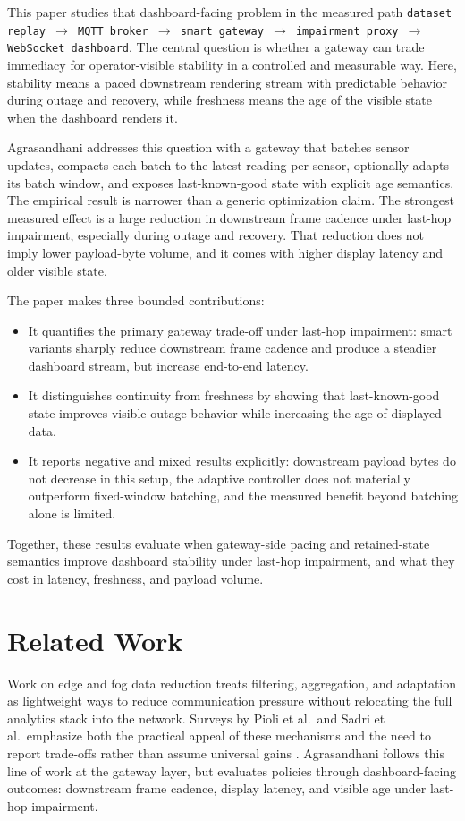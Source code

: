 \documentclass[sigconf,authorversion,nonacm]{acmart}
\begin{document}
This paper studies that dashboard-facing problem in the measured path \texttt{dataset replay $\rightarrow$ MQTT broker $\rightarrow$ smart gateway $\rightarrow$ impairment proxy $\rightarrow$ WebSocket dashboard}. The central question is whether a gateway can trade immediacy for operator-visible stability in a controlled and measurable way. Here, stability means a paced downstream rendering stream with predictable behavior during outage and recovery, while freshness means the age of the visible state when the dashboard renders it.

Agrasandhani addresses this question with a gateway that batches sensor updates, compacts each batch to the latest reading per sensor, optionally adapts its batch window, and exposes last-known-good state with explicit age semantics. The empirical result is narrower than a generic optimization claim. The strongest measured effect is a large reduction in downstream frame cadence under last-hop impairment, especially during outage and recovery. That reduction does not imply lower payload-byte volume, and it comes with higher display latency and older visible state.

The paper makes three bounded contributions:
\begin{itemize}
  \item It quantifies the primary gateway trade-off under last-hop impairment: smart variants sharply reduce downstream frame cadence and produce a steadier dashboard stream, but increase end-to-end latency.
  \item It distinguishes continuity from freshness by showing that last-known-good state improves visible outage behavior while increasing the age of displayed data.
  \item It reports negative and mixed results explicitly: downstream payload bytes do not decrease in this setup, the adaptive controller does not materially outperform fixed-window batching, and the measured benefit beyond batching alone is limited.
\end{itemize}

Together, these results evaluate when gateway-side pacing and retained-state semantics improve dashboard stability under last-hop impairment, and what they cost in latency, freshness, and payload volume.

\section{Related Work}

Work on edge and fog data reduction treats filtering, aggregation, and adaptation as lightweight ways to reduce communication pressure without relocating the full analytics stack into the network. Surveys by Pioli et al.\ and Sadri et al.\ emphasize both the practical appeal of these mechanisms and the need to report trade-offs rather than assume universal gains \cite{pioli2022_edge_data_reduction_mapping,sadri2022_fog_data_reduction_survey}. Agrasandhani follows this line of work at the gateway layer, but evaluates policies through dashboard-facing outcomes: downstream frame cadence, display latency, and visible age under last-hop impairment.
\end{document}
